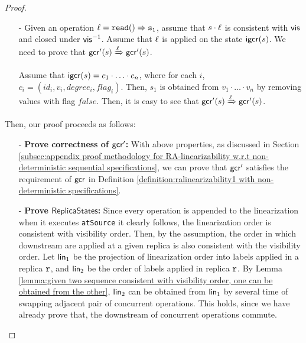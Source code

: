 {\begin {proof}
\begin{itemize}
\begin{itemize}
    \item[-] Given an operation $\alabel = \alabellong[{\tt read}]{}{s_1}{}$, assume that $s \cdot \ell$ is consistent with $\mathsf{vis}$ and closed under $\mathsf{vis}^{-1}$. Assume that $\ell$ is applied on the state $\mathsf{igcr}(s)$. We need to prove that $\mathsf{gcr}'(s)\xRightarrow{\ensuremath{\ell}}\mathsf{gcr}'(s)$.

        Assume that $\mathsf{igcr}(s)=c_1 \cdot \ldots \cdot c_n$, where for each $i$, $c_i = (id_i,v_i,degree_i,flag_i)$. Then, $s_1$ is obtained from $v_1 \cdot \ldots \cdot v_n$ by removing values with flag $\mathit{false}$. Then, it is easy to see that $\mathsf{gcr}'(s)\xRightarrow{\ensuremath{\ell}}\mathsf{gcr}'(s)$.
    \end{itemize}

\end{itemize}

Then, our proof proceeds as follows:

\begin{itemize}
\setlength{\itemsep}{0.5pt}
\item[-] {\bf Prove correctness of $\mathsf{gcr}'$:} With above properties, as discussed in Section \ref{subsec:appendix proof methodology for RA-linearizability w.r.t non-deterministic sequential specifications}, we can prove that $\mathsf{gcr}'$ satisfies the requirement of $\mathsf{gcr}$ in Definition \ref{definition:ralinearizability1 with non-deterministic specifications}.

\item[-] {\bf Prove $\mathsf{ReplicaStates}$:} Since every operation is appended to the linearization when it executes {\tt atSource} it clearly follows, the linearization order is consistent with visibility order. Then, by the {} assumption, the order in which downstream are applied at a given replica is also consistent with the visibility order. Let $\mathsf{lin}_1$ be the projection of linearization order into labels applied in a replica $\mathtt{r}$, and $\mathsf{lin}_2$ be the order of labels applied in replica $\mathtt{r}$. By Lemma \ref{lemma:given two sequence consistent with visibility order, one can be obtained from the other}, $\mathsf{lin}_2$ can be obtained from $\mathsf{lin}_1$ by several time of swapping adjacent pair of concurrent operations. This holds, since we have already prove that, the downstream of concurrent operations commute.


\end{itemize}
\end{proof}}
